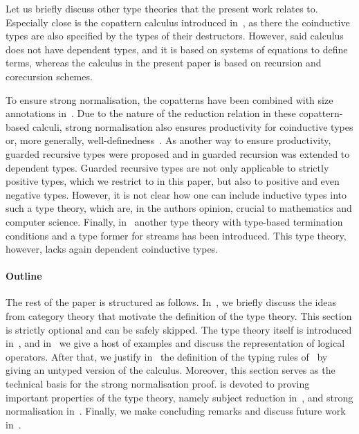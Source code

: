\documentclass[preprint]{sigplanconf}
\begin{document}
Let us briefly discuss other type theories that the present work relates to.
Especially close is the copattern calculus introduced
in~\cite{Abel2013-Copatterns}, as there the coinductive types are also
specified by the types of their destructors.
However, said calculus does not have dependent types, and it is based on
systems of equations to define terms, whereas the calculus in the present paper
is based on recursion and corecursion schemes.

To ensure strong normalisation, the copatterns have been combined with size
annotations in~\cite{Abel2013}.
Due to the nature of the reduction relation in these copattern-based calculi,
strong normalisation also ensures productivity for coinductive types or,
more generally, well-definedness~\cite{BasoldHansen:Welldef-Equiv-CoInd}.
As another way to ensure productivity, guarded recursive types were proposed
and in \cite{Bizjak:GuardedDepRecTypes} guarded recursion was extended to
dependent types.
Guarded recursive types are not only applicable to strictly positive types,
which we restrict to in this paper, but also to positive and even negative
types.
However, it is not clear how one can include inductive types into such
a type theory, which are, in the authors opinion, crucial to mathematics
and computer science.
Finally, in~\cite{Sacchini-TypeBasedProductivity} another type theory
with type-based termination conditions and a type former for streams
has been introduced.
This type theory, however, lacks again dependent coinductive types.

\paragraph{Outline}

The rest of the paper is structured as follows.
In~, we briefly discuss the ideas from category theory
that motivate the definition of the type theory.
This section is strictly optional and can be safely skipped.
The type theory itself is introduced in~, and
in~ we give a host of examples and discuss the representation
of logical operators.
After that, we justify in~ the definition of the typing
rules of~ by giving an untyped version of the calculus.
Moreover, this section serves as the technical basis for the strong
normalisation proof.
 is devoted to proving important properties of the type
theory, namely subject reduction in~, and
strong normalisation in~.
Finally, we make concluding remarks and discuss future work
in~.
\end{document}
